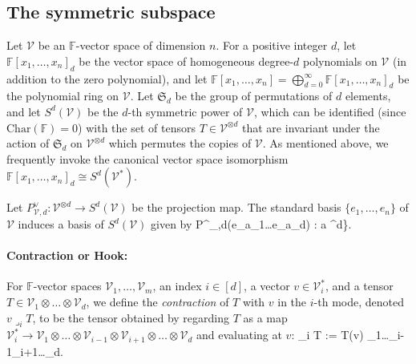 \documentclass[11pt]{article}
\theoremstyle{definition}
\newcommand{\setft}[1]{\mathrm{#1}}
\newcommand{\field}{\mathbb{F}}
\newcommand\V{\mathcal{V}}
\newcommand{\hook}{\mathbin{\lrcorner}}
\def\ba#1\ea{\begin{align}#1\end{align}}
\begin{document}
\subsection{The symmetric subspace}
Let $\V$ be an $\field$-vector space of dimension $n$. For a positive integer $d$, let $\field[x_1,\dots, x_n]_d$ be the vector space of homogeneous degree-$d$ polynomials on $\V$ (in addition to the zero polynomial), and let $\field[x_1,\dots, x_n]=\bigoplus_{d=0}^\infty \field[x_1,\dots,x_n]_d$ be the polynomial ring on $\V$. Let $\mathfrak{S}_d$ be the group of permutations of $d$ elements, and let $S^d(\V)$ be the $d$-th symmetric power of $\V$, which can be identified (since $\setft{Char}(\field)=0$) with the set of tensors $T\in \V^{\otimes d}$ that are invariant under the action of $\mathfrak{S}_d$ on $\V^{\otimes d}$ which permutes the copies of $\V$. As mentioned above, we frequently invoke the canonical vector space isomorphism $\field[x_1,\dots, x_n]_d \cong S^d(\V^*)$.

Let $P^{\vee}_{\V,d}: \V^{\otimes d} \rightarrow S^d(\V)$ be the projection map. The standard basis $\{e_1,\dots, e_n\}$ of $\V$ induces a basis of $S^d(\V)$ given by
\ba
\{P^{\vee}_{\V,d}(e_{a_1}\otimes \dots \otimes e_{a_d}) : a \in [n]^{\vee d}\}.
\ea

\paragraph{Contraction or Hook:} For $\field$-vector spaces $\V_1,\dots, \V_m$, an index $i \in [d]$, a vector $v \in \V_i^*$, and a tensor $T \in \V_1 \otimes \dots \otimes \V_d$, we define the \textit{contraction} of $T$ with $v$ in the $i$-th mode, denoted $v \hook_i T$, to be the tensor obtained by regarding $T$ as a map $\V_i^* \rightarrow \V_1 \otimes \dots \otimes \V_{i-1}\otimes \V_{i+1} \otimes \dots \otimes \V_d$ and evaluating at $v$:
\ba
v \hook_i T := T(v) \in \V_1\otimes \dots \otimes \V_{i-1}\otimes \V_{i+1}\otimes \dots \otimes \V_d.
\ea
\end{document}
